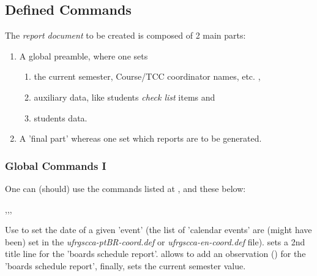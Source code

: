 \documentclass[dctools,english]{ufrgscca} %
\begin{document}
\subsection{Defined Commands}
The \emph{report document} to be created is composed of 2 main parts:
\begin{enumerate}
	\item A global preamble, where one sets
	\begin{enumerate}
		\item the current semester, Course/TCC coordinator names, etc. ,
		\item auxiliary data, like students \emph{check list} items and
		\item students data.
	\end{enumerate}
    \item A 'final part' whereas one set which reports are to be generated.
\end{enumerate}

\subsubsection{Global Commands I}
One can (should) use the commands listed at , and these below:

\begin{Macros}{\tcccalendareventdate,\boardstitleB,\boardsOBS,\TCCperiod}
	\begin{Syntax}%
	\end{Syntax}
Use \Macro{\tcccalendareventdate}{} to set the date of a given 'event' (the list of 'calendar events' are (might have been) set in the \emph{ufrgscca-ptBR-coord.def} or \emph{ufrgscca-en-coord.def} file).  sets a 2nd title line for the 'boards schedule report'. \Macro{\boardsOBS}{} allows to add an observation () for the 'boards schedule report', finally, \Macro{\TCCperiod} sets the current semester value.
\end{Macros}
\end{document}
